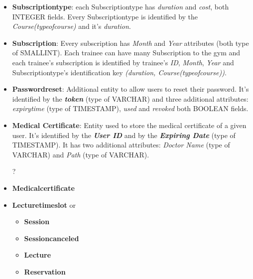\begin{itemize}
    	\item \textbf{Subscription\textunderscore type}: each Subscription\textunderscore type has \textit{duration} and \textit{cost}, both INTEGER fields. Every Subscription\textunderscore type is identified by the \textit{Course(type\textunderscore of\textunderscore course)} and it's \textit{duration}.
    	
    	\item \textbf{Subscription}: Every subscription has \textit{Month} and \textit{Year} attributes (both type of SMALLINT). Each trainee can have many Subscription to the gym and each trainee's subscription is identified by trainee's \textit{ID}, \textit{Month}, \textit{Year} and Subscription\textunderscore type's identification key \textit{(duration, Course(type\textunderscore of\textunderscore course))}.
    	
    	\item \textbf{Password\textunderscore reset}: Additional entity to allow users to reset their password. It's identified by the \textbf{\textit{token}} (type of VARCHAR) and three additional attributes: \textit{expiry\textunderscore time} (type of TIMESTAMP), \textit{used} and \textit{revoked} both BOOLEAN fields.
        
        \item \textbf{Medical Certificate}: Entity used to store the medical certificate of a given user. It's identified by the \textbf{\textit{User ID}} and by the \textbf{\textit{Expiring Date}} (type of TIMESTAMP). It has two additional attributes: \textit{Doctor Name} (type of VARCHAR) and \textit{Path} (type of VARCHAR).
        	
    	\color{red}
    	\item[?]
    	\item \textbf{Medical\textunderscore certificate}
    	
    	\item \textbf{Lecture\textunderscore time\textunderscore slot} or
		\begin{itemize}
    	    \item \textbf{Session}
		    \item \textbf{Session\textunderscore canceled}
		    \item \textbf{Lecture}
		    \item \textbf{Reservation}
    	\end{itemize}
		\color{black}
	
    \end{itemize}